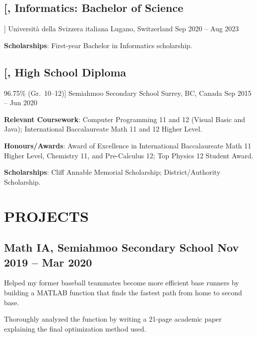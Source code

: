 \documentclass{article}
\newcommand{\datedsubsection}[4][]{
    \subsection*{
        \textbf{\large #2}, #3 \hfill #4
    } %
    \vspace{-4pt} %
    #1 %
}
\begin{document}
{    %
    
    \datedsubsection
        [\textit{Informatics: Bachelor of Science}]
        {Universit\`a della Svizzera italiana}
        {Lugano, Switzerland}
        {Sep 2020 -- Aug 2023}
    
    \begin{compactitem}
    
    \item\textbf{Scholarships}:
    First-year Bachelor in Informatics scholarship.
    
    \end{compactitem}
    
    
    
    \datedsubsection
        [\textit{High School Diploma} 
        \hfill 96.75\% (Gr.\ 10--12)]
        {Semiahmoo Secondary School}
        {Surrey, BC, Canada}
        {Sep 2015 -- Jun 2020}
    
    \begin{compactitem}
    
    \item\textbf{Relevant Coursework}:
    Computer Programming 11 and 12 (Visual Basic and Java);
    International Baccalaureate Math 11 and 12 Higher Level.
    
    \item\textbf{Honours/Awards}:
    Award of Excellence in International Baccalaureate Math 11 Higher Level, Chemistry 11, and Pre-Calculus 12;
    Top Physics 12 Student Award.
    
    \item\textbf{Scholarships}:
    Cliff Annable Memorial Scholarship;
    District/Authority Scholarship.
    
    \end{compactitem}
    
    
    
    
    \section{PROJECTS}
    
    
    \datedsubsection{Math IA}
                    {Semiahmoo Secondary School}
                    {Nov 2019 -- Mar 2020}
    
    \begin{compactitem}
    \item Helped my former baseball teammates become more efficient base runners by building a MATLAB function that finds the fastest path from home to second base.
    \item Thoroughly analyzed the function by writing a 21-page academic paper explaining the final optimization method used.
    \end{compactitem}
    
}
\end{document}
